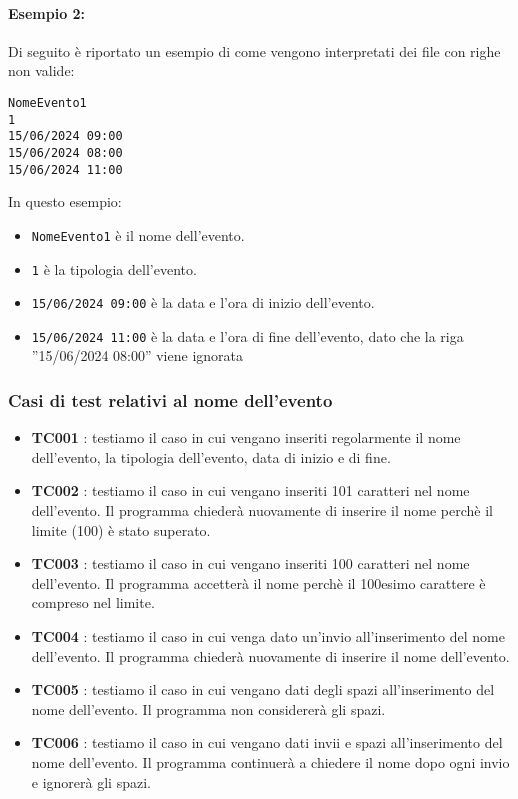 \documentclass[11pt]{scrartcl} %
\begin{document}
\paragraph{Esempio 2:}

Di seguito è riportato un esempio di come vengono interpretati dei file con righe non valide:

\begin{lstlisting}
NomeEvento1
1
15/06/2024 09:00
15/06/2024 08:00
15/06/2024 11:00
\end{lstlisting}

In questo esempio:
\begin{itemize}
	\item \texttt{NomeEvento1} è il nome dell'evento.
	\item \texttt{1} è la tipologia dell'evento.
	\item \texttt{15/06/2024 09:00} è la data e l'ora di inizio dell'evento.
	\item \texttt{15/06/2024 11:00} è la data e l'ora di fine dell'evento, dato che la riga ''15/06/2024 08:00'' viene ignorata
\end{itemize}


\subsubsection{Casi di test relativi al nome dell'evento}

\begin{itemize}
	\item \textbf{TC001} : testiamo il caso in cui vengano inseriti regolarmente il nome dell’evento, la tipologia dell’evento, data di inizio e di fine.

	\item \textbf{TC002} : testiamo il caso in cui vengano inseriti 101 caratteri nel nome dell’evento. Il programma chiederà nuovamente di inserire il nome perchè il limite (100) è stato superato.

	\item \textbf{TC003} : testiamo il caso in cui vengano inseriti 100 caratteri nel nome dell’evento. Il programma accetterà il nome perchè il 100esimo carattere è compreso nel limite.

	\item \textbf{TC004} : testiamo il caso in cui venga dato un’invio all’inserimento del nome dell’evento. Il programma chiederà nuovamente di inserire il nome dell’evento.

	\item \textbf{TC005} : testiamo il caso in cui vengano dati degli spazi all’inserimento del nome dell’evento. Il programma non considererà gli spazi.

	\item \textbf{TC006} : testiamo il caso in cui vengano dati invii e spazi all’inserimento del nome dell’evento. Il programma continuerà a chiedere il nome dopo ogni invio e ignorerà gli spazi.

\end{itemize}
\end{document}
